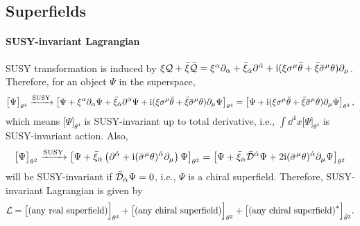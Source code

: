 \documentclass[CheatSheet]{subfiles}
\newcommand{\OQ}{{\mathcal Q}}
\newcommand{\OD}{{\mathcal D}}
\begin{document}
\subsection{Superfields}
\paragraph{SUSY-invariant Lagrangian}
SUSY transformation is induced by $\xi \OQ + \bar\xi\bar \OQ = \xi^\alpha\partial_\alpha + \bar\xi_\dalpha\partial^{\dalpha} + \ii(\xi\sigma^\mu\btheta+\bar\xi\bar\sigma^\mu\theta)\partial_\mu$.
Therefore, for an object $\Psi$ in the superspace,
\begin{equation}
 \bigl[\Psi\bigr]_{\theta^4}\xrightarrow{\text{SUSY}}
 \left[\Psi + \xi^\alpha\partial_\alpha\Psi + \bar\xi_{\dot\alpha}\partial^{{\dot\alpha}}\Psi + \mathrm{i}(\xi\sigma^\mu\bar\theta+\bar\xi\bar\sigma^\mu\theta)\partial_\mu\Psi\right]_{\theta^4}
=
 \left[\Psi +
\mathrm{i}(\xi\sigma^\mu\bar\theta+\bar\xi\bar\sigma^\mu\theta)\partial_\mu\Psi\right]_{\theta^4},
\end{equation}
which means $\bigl[\Psi\bigr]_{\theta^4}$ is SUSY-invariant up to total derivative, i.e., $\int\dd^4x \bigl[\Psi\bigr]_{\theta^4}$ is SUSY-invariant action. Also,
\begin{equation}
  \bigl[\Psi\bigr]_{\theta^2}\xrightarrow{\text{SUSY}}
 \left[\Psi + \bar\xi_\dalpha\left(\partial^{\dalpha} + \ii(\bar\sigma^{\mu}\theta)^\dalpha\partial_\mu\right)\Psi\right]_{\theta^2}
=\left[\Psi + \bar\xi_\dalpha\bar \OD^\dalpha\Psi+2\ii(\bar\sigma^{\mu}\theta)^\dalpha\partial_\mu\Psi\right]_{\theta^2}
\end{equation}
will be SUSY-invariant if $\bar \OD_\dalpha\Psi=0$, i.e., $\Psi$ is a chiral superfield. Therefore, SUSY-invariant Lagrangian is given by
\begin{equation}
 \mathcal L = \bigl[\text{(any real superfield)}\Bigr]_{\theta^4} + \bigl[\text{(any chiral superfield)}\Bigr]_{\theta^2} + \bigl[\text{(any chiral superfield)}^*\Bigr]_{\bar\theta^2}.
\label{eq:susy-inv}
\end{equation}
\end{document}

